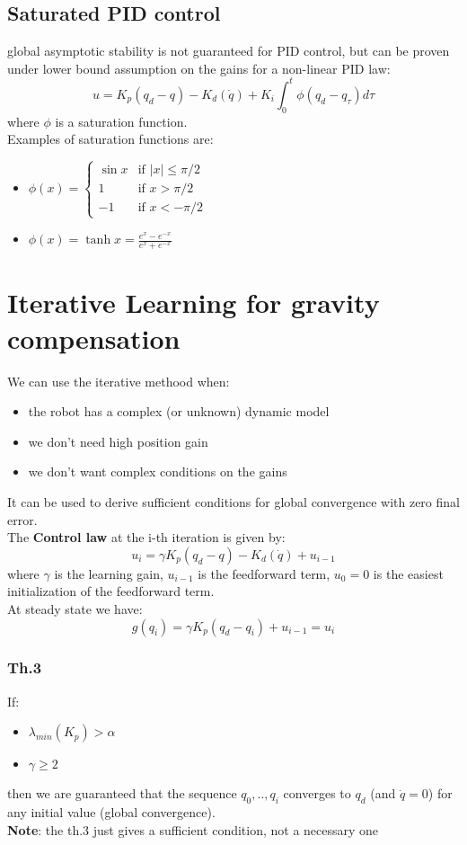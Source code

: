 \documentclass[a4paper,12pt]{article}
\begin{document}
\subsection{Saturated PID control}
global asymptotic stability is not guaranteed for PID control, but can be
proven under lower bound assumption on the gains for a 
non-linear PID law:
\begin{equation}
    u = K_p(q_d-q) - K_d(\dot{q}) + K_i \int_0^t \phi(q_d-q_\tau)d\tau
\end{equation}
where $\phi$ is a saturation function.\\
Examples of saturation functions are:
\begin{itemize}
    \item $\phi(x) = \begin{cases}
        \sin x & \text{if } |x| \leq \pi/2\\
        1 & \text{if } x > \pi/2\\
        -1 & \text{if } x < -\pi/2
    \end{cases}$
    \item $\phi(x) =\tanh x = \frac{e^x-e^{-x}}{e^x+e^{-x}}$
\end{itemize}
\section{Iterative Learning for gravity compensation}
We can use the iterative methood when:
\begin{itemize}
    \item the robot has a complex (or unknown) dynamic model
    \item we don't need high position gain 
    \item we don't want complex conditions on the gains
\end{itemize}
It can be used to derive sufficient conditions for global
convergence with zero final error.\\
The \textbf{Control law} at the i-th iteration is given by:
\begin{equation}
    u_i = \gamma K_p(q_d-q) - K_d(\dot{q}) + u_{i-1}
\end{equation}
where $\gamma$ is the learning gain, $u_{i-1}$ is 
the feedforward term, $u_0=0$ is the easiest 
initialization of the feedforward term.\\
At steady state we have:
\begin{equation}
    g(q_i)=\gamma K_p(q_d-q_i) + u_{i-1} = u_i
\end{equation}
\subsubsection{Th.3} \label{sec:Th.3}
If:
\begin{itemize}
    \item $\lambda_{min}(K_p) > \alpha$
    \item $\gamma \geq 2$
\end{itemize}
then we are guaranteed that the sequence ${q_0,..,q_i}$ converges
 to $q_d$ (and $\dot{q}=0$)  for any initial value (global convergence).\\
\textbf{Note}: the th.3 just gives a sufficient condition, not a
     necessary one
\end{document}
